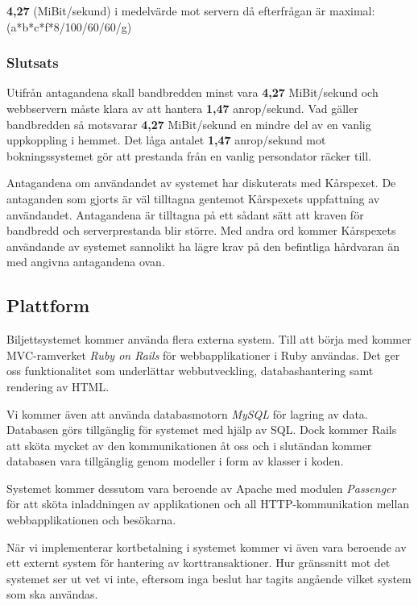 \documentclass[a4paper, twoside, 11pt, titlepage]{article}
\begin{document}
		\textbf{4,27} (MiBit/sekund) i medelvärde mot servern då efterfrågan är maximal: (a*b*c*f*8/100/60/60/g)

		\subsubsection{Slutsats}


		Utifrån antagandena skall bandbredden minst vara \textbf{4,27} MiBit/sekund och webbservern måste klara av att hantera \textbf{1,47} anrop/sekund. Vad gäller bandbredden så motsvarar \textbf{4,27} MiBit/sekund en mindre del av en vanlig uppkoppling i hemmet. Det låga antalet \textbf{1,47} anrop/sekund mot bokningssystemet gör att prestanda från en vanlig persondator räcker till.

		Antagandena om användandet av systemet har diskuterats med Kårspexet. De antaganden som gjorts är väl tilltagna gentemot Kårspexets uppfattning av användandet. Antagandena är tilltagna på ett sådant sätt att kraven för bandbredd och serverprestanda blir större. Med andra ord kommer Kårspexets användande av systemet sannolikt ha lägre krav på den befintliga hårdvaran än med angivna antagandena ovan.

	\subsection{Plattform}


	Biljettsystemet kommer använda flera externa system. Till att börja med kommer MVC-ramverket \emph{Ruby on Rails} för webbapplikationer i Ruby användas. Det ger oss funktionalitet som underlättar webbutveckling, databashantering samt rendering av HTML.

	Vi kommer även att använda databasmotorn \emph{MySQL} för lagring av data. Databasen görs tillgänglig för systemet med hjälp av SQL. Dock kommer Rails att sköta mycket av den kommunikationen åt oss och i slutändan kommer databasen vara tillgänglig genom modeller i form av klasser i koden.

	Systemet kommer dessutom vara beroende av Apache med modulen \emph{Passenger} för att sköta inladdningen av applikationen och all HTTP-kommunikation mellan webbapplikationen och besökarna.

	När vi implementerar kortbetalning i systemet kommer vi även vara beroende av ett externt system för hantering av korttransaktioner. Hur gränssnitt mot det systemet ser ut vet vi inte, eftersom inga beslut har tagits angående vilket system som ska användas.
\end{document}

